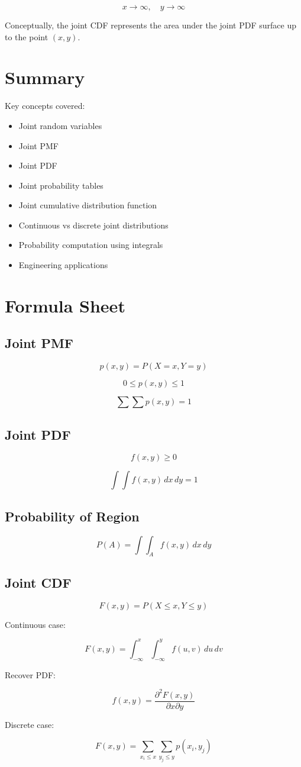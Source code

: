 \documentclass[12pt,a4paper]{article}
\begin{document}
\[
x\to \infty, \quad y\to \infty
\]

Conceptually, the joint CDF represents the area under the joint PDF surface up to the point $(x,y)$.

\section{Summary}

Key concepts covered:

\begin{itemize}
\item Joint random variables
\item Joint PMF
\item Joint PDF
\item Joint probability tables
\item Joint cumulative distribution function
\item Continuous vs discrete joint distributions
\item Probability computation using integrals
\item Engineering applications
\end{itemize}

\section{Formula Sheet}

\subsection*{Joint PMF}

\[
p(x,y)=P(X=x,Y=y)
\]

\[
0 \le p(x,y) \le 1
\]

\[
\sum\sum p(x,y)=1
\]

\subsection*{Joint PDF}

\[
f(x,y)\ge0
\]

\[
\int\int f(x,y)\,dx\,dy=1
\]

\subsection*{Probability of Region}

\[
P(A)=\int\int_A f(x,y)\,dx\,dy
\]

\subsection*{Joint CDF}

\[
F(x,y)=P(X\le x,Y\le y)
\]

Continuous case:

\[
F(x,y)=\int_{-\infty}^{x}\int_{-\infty}^{y}f(u,v)\,du\,dv
\]

Recover PDF:

\[
f(x,y)=\frac{\partial^2 F(x,y)}{\partial x \partial y}
\]

Discrete case:

\[
F(x,y)=\sum_{x_i\le x}\sum_{y_j\le y}p(x_i,y_j)
\]
\end{document}
